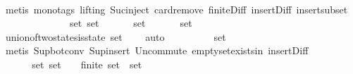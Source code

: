 \begin{isabellebody}
\ \ \ \ \ \ \ \ \isamarkupfalse%
\ {\isacharparenleft}metis\ {\isacharparenleft}mono{\isacharunderscore}tags{\isacharcomma}\ lifting{\isacharparenright}\ Suc{\isacharunderscore}inject\ card{\isachardot}remove\ finite{\isacharunderscore}Diff\ insert{\isacharunderscore}Diff\ insert{\isacharunderscore}subset{\isacharparenright}\ \ \isanewline
\ \ \ \ \ \ \isamarkupfalse%
\ \isamarkupfalse%
\ {\isachardoublequoteopen}{\isasymforall}\ {\isasymsigma}\ {\isasymin}\ {\isasymsigma}{\isacharunderscore}set{\isachardot}\ {\isasymsigma}{\isacharunderscore}set\ {\isacharminus}\ {\isacharbraceleft}{\isasymsigma}{\isacharbraceright}\ {\isasymsubseteq}\ {\isasymSigma}\ {\isasymand}\ {\isasymUnion}\ {\isacharparenleft}{\isasymsigma}{\isacharunderscore}set\ {\isacharminus}\ {\isacharbraceleft}{\isasymsigma}{\isacharbraceright}{\isacharparenright}\ {\isasymin}\ {\isasymSigma}\ {\isasymand}\ {\isasymUnion}\ {\isacharparenleft}{\isasymsigma}{\isacharunderscore}set\ {\isacharminus}\ {\isacharbraceleft}{\isasymsigma}{\isacharbraceright}{\isacharparenright}\ {\isasymunion}\ {\isasymsigma}\ {\isasymin}\ {\isasymSigma}{\isachardoublequoteclose}\isanewline
\ \ \ \ \ \ \ \ \isamarkupfalse%
\ union{\isacharunderscore}of{\isacharunderscore}two{\isacharunderscore}states{\isacharunderscore}is{\isacharunderscore}state\ {\isacartoucheopen}{\isasymsigma}{\isacharunderscore}set\ {\isasymsubseteq}\ {\isasymSigma}{\isacartoucheclose}\ \isamarkupfalse%
\ auto\isanewline
\ \ \ \ \ \ \isamarkupfalse%
\ \isamarkupfalse%
\ {\isachardoublequoteopen}{\isasymUnion}{\isasymsigma}{\isacharunderscore}set\ {\isasymin}\ {\isasymSigma}{\isachardoublequoteclose}\isanewline
\ \ \ \ \ \ \ \ \isamarkupfalse%
\ {\isacharparenleft}metis\ Sup{\isacharunderscore}bot{\isacharunderscore}conv{\isacharparenleft}{}{\isacharparenright}\ Sup{\isacharunderscore}insert\ Un{\isacharunderscore}commute\ empty{\isacharunderscore}set{\isacharunderscore}exists{\isacharunderscore}in{\isacharunderscore}{\isasymSigma}\ insert{\isacharunderscore}Diff{\isacharparenright}\isanewline
\ \ \ \ \isamarkupfalse%
\isanewline
\ \ \isamarkupfalse%
\isanewline
\ \ \isamarkupfalse%
\ \isamarkupfalse%
\ {\isachardoublequoteopen}\ {\isasymAnd}{\isasymsigma}{\isacharunderscore}set{\isachardot}\ {\isasymsigma}{\isacharunderscore}set\ {\isasymsubseteq}\ {\isasymSigma}\ {\isasymLongrightarrow}\ finite\ {\isasymsigma}{\isacharunderscore}set\ {\isasymLongrightarrow}\ {\isasymUnion}{\isasymsigma}{\isacharunderscore}set\ {\isasymin}\ {\isasymSigma}{\isachardoublequoteclose}\isanewline

\end{isabellebody}
